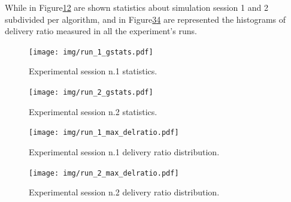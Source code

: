 While in Figure\ref{fig:run_1_gstats}\ref{fig:run_2_gstats} are shown statistics about simulation session 1 and 2 subdivided per algorithm, and in Figure\ref{fig:run_1_max_delratio}\ref{fig:run_2_max_delratio} are represented the histograms of delivery ratio measured in all the experiment's runs.

\begin{figure}[h!]
	\begin{center}
    \texttt{[image: img/run\_1\_gstats.pdf]}
    \caption{Experimental session n.1 statistics.}
    \label{fig:run_1_gstats}
  \end{center}
\end{figure}
\begin{figure}[h!]
	\begin{center}
    \texttt{[image: img/run\_2\_gstats.pdf]}
    \caption{Experimental session n.2 statistics.}
    \label{fig:run_2_gstats}
  \end{center}
\end{figure}
\newpage
\begin{figure}[h!]
	\begin{center}
    \texttt{[image: img/run\_1\_max\_delratio.pdf]}
    \caption{Experimental session n.1 delivery ratio distribution.}
    \label{fig:run_1_max_delratio}
  \end{center}
\end{figure}
\begin{figure}[h!]
	\begin{center}
    \texttt{[image: img/run\_2\_max\_delratio.pdf]}
    \caption{Experimental session n.2 delivery ratio distribution.}
    \label{fig:run_2_max_delratio}
  \end{center}
\end{figure}
\newpage